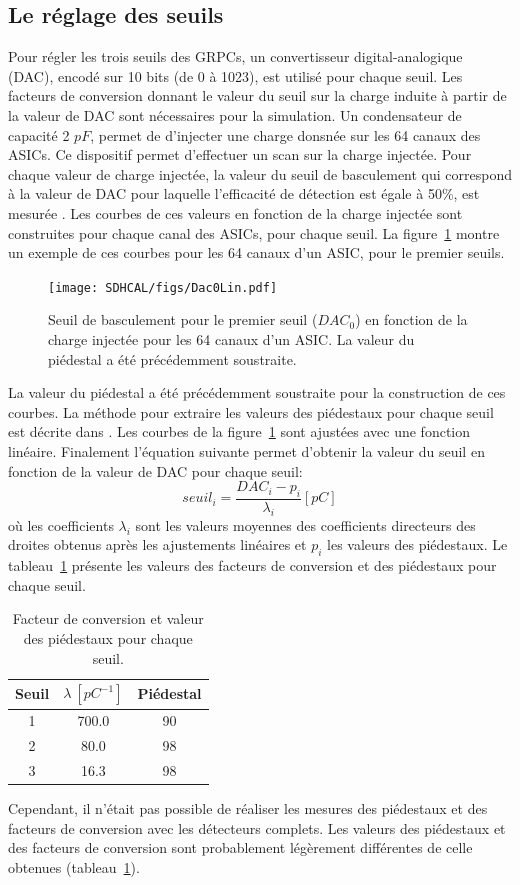\subsection{Le réglage des seuils}
\label{sec.sdhcal_thr}
Pour régler les trois seuils des GRPCs, un convertisseur digital-analogique (DAC), encodé sur 10 bits (de 0 à 1023), est utilisé pour chaque seuil. Les facteurs de conversion donnant le valeur du seuil sur la charge induite à partir de la valeur de DAC sont nécessaires pour la simulation. Un condensateur de capacité 2 $pF$, permet de d'injecter une charge donsnée sur les 64 canaux des ASICs. Ce dispositif permet d'effectuer un scan sur la charge injectée. Pour chaque valeur de charge injectée, la valeur du seuil de basculement qui correspond à la valeur de DAC pour laquelle l'efficacité de détection est égale à 50\%, est mesurée \cite{kieffer}. Les courbes de ces valeurs en fonction de la charge injectée sont construites pour chaque canal des ASICs, pour chaque seuil. La figure~\ref{dac-vs-inj} montre un exemple de ces courbes pour les 64 canaux d'un ASIC, pour le premier seuils. 
\begin{figure}[!ht]
  \centering
  \texttt{[image: SDHCAL/figs/Dac0Lin.pdf]}
  \caption{Seuil de basculement pour le premier seuil ($DAC_0$) en fonction de la charge injectée pour les 64 canaux d'un ASIC. La valeur du piédestal a été précédemment soustraite.}
  \label{dac-vs-inj}
\end{figure}
La valeur du piédestal a été précédemment soustraite pour la construction de ces courbes. La méthode pour extraire les valeurs des piédestaux pour chaque seuil est décrite dans \cite{kieffer}. Les courbes de la figure~\ref{dac-vs-inj} sont ajustées avec une fonction linéaire. Finalement l'équation suivante permet d'obtenir la valeur du seuil en fonction de la valeur de DAC pour chaque seuil:
\begin{equation}
  seuil_i = \frac{DAC_i-p_i}{\lambda_i} [pC]
  \label{eq.dacConversion}
\end{equation}
où les coefficients $\lambda_i$ sont les valeurs moyennes des coefficients directeurs des droites obtenus après les ajustements linéaires et $p_i$ les valeurs des piédestaux.
Le tableau~\ref{tab.lambdas} présente les valeurs des facteurs de conversion et des piédestaux pour chaque seuil.
\begin{table}[!ht]
  \begin{center}
    \begin{tabular}{c|c|c}
      Seuil & $\lambda~[pC^{-1}]$ & Piédestal\\
      \hline
      1 & 700.0 & 90\\
      2 & 80.0 & 98\\
      3 & 16.3 & 98
    \end{tabular}
  \end{center}  
  \caption{Facteur de conversion et valeur des piédestaux pour chaque seuil.}
  \label{tab.lambdas}
\end{table}
Cependant, il n'était pas possible de réaliser les mesures des piédestaux et des facteurs de conversion avec les détecteurs complets. Les valeurs des piédestaux et des facteurs de conversion sont probablement légèrement différentes de celle obtenues (tableau~\ref{tab.lambdas}).


